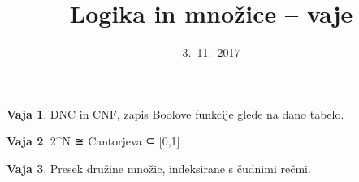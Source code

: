 \documentclass{article}
\theoremstyle{definition}
\newtheorem{vaja}{Vaja}
\begin{document}
\title{Logika in množice -- vaje}
\date{3.~11.~2017}
\maketitle

\begin{vaja}
  DNC in CNF, zapis Boolove funkcije glede na dano tabelo.
\end{vaja}

\begin{vaja}
  2^N ≅ Cantorjeva ⊆ [0,1]
\end{vaja}

\begin{vaja}
  Presek družine množic, indeksirane s čudnimi rečmi.
\end{vaja}
\end{document}
